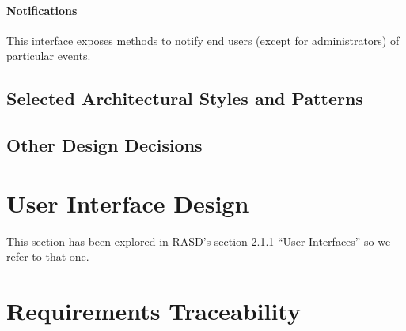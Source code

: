 \documentclass{article}
\begin{document}
\begin{itemize}

	
\paragraph{Notifications}
This interface exposes methods to notify end users (except for administrators) of particular events. 
	
	
	
\end{itemize}
\subsection{Selected Architectural Styles and Patterns}
\subsection{Other Design Decisions}
%


\section{User Interface Design}
This section has been explored in RASD's section 2.1.1 ``User Interfaces'' so we refer to that one.

\section{Requirements Traceability}
\end{document}
